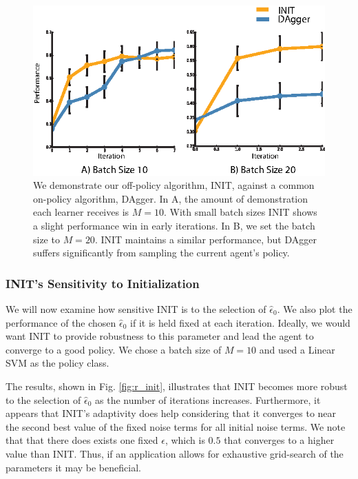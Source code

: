 \documentclass[conference]{article}
\begin{document}
\begin{figure}
\centering
\includegraphics{f_figs/batch_size.eps}
\caption{
    \footnotesize
We demonstrate our off-policy algorithm, INIT, against a common on-policy algorithm, DAgger. In A, the amount of demonstration each learner receives is $M=10$. With small batch sizes INIT shows a slight performance win in early iterations. In B, we set the batch size to $M=20$. INIT maintains a similar performance, but DAgger suffers significantly from sampling the current agent's policy.  }
\vspace*{-20pt}
\label{fig:batch_size}
\end{figure}


\subsubsection{INIT's Sensitivity to Initialization} 
We will now examine how sensitive INIT is to the selection of $\hat{\epsilon}_0$.  We also plot the performance of the chosen $\hat{\epsilon}_0$ if it is held fixed at each iteration. Ideally, we would want INIT to provide robustness to this parameter and lead the agent to converge to a good policy. We chose a batch size of $M=10$ and used a Linear SVM as the policy class. 

The results, shown in Fig. \ref{fig:r_init}, illustrates that INIT becomes more robust to the selection of $\hat{\epsilon}_0$ as the number of iterations increases. Furthermore, it appears that INIT's adaptivity does help considering that it converges to near the second best value of the fixed noise terms for all initial noise terms. We note that that there does exists one fixed $\epsilon$, which is $0.5$ that converges to a higher value than INIT.  Thus, if an application allows for exhaustive grid-search of the parameters it may be beneficial. 
\end{document}
